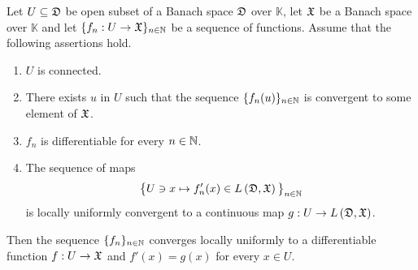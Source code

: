 \begin{theorem}\label{theorem:convergence_of_differentiable_functions}
Let $U\subseteq {\mathfrak D}$ be open subset of a Banach space ${\mathfrak D}$ over $\mathbb{K}$, let ${\mathfrak X}$ be a Banach space over $\mathbb{K}$  and let $\{f_n:U\rightarrow {\mathfrak X}\}_{n\in {\mathbb N}}$ be a sequence of functions. Assume that the following assertions hold.
\begin{enumerate}[label=\emph{\textbf{(\arabic*)}}, leftmargin=*]
\item $U$ is connected.
\item There exists $u$ in $U$ such that the sequence $\{f_n(u)\}_{n\in {\mathbb N}}$ is convergent to some element of ${\mathfrak X}$.
\item $f_n$ is differentiable for every $n\in {\mathbb N}$.
\item The sequence of maps
$$\big\{U\ni x \mapsto f_n'(x) \in L\left({\mathfrak D},{\mathfrak X}\right)\big\}_{n\in {\mathbb N}}$$
is locally uniformly convergent to a continuous map $g:U\rightarrow L\left({\mathfrak D},{\mathfrak X}\right)$.
\end{enumerate}
Then the sequence $\{f_n\}_{n\in {\mathbb N}}$ converges locally uniformly to a differentiable function $f:U\rightarrow {\mathfrak X}$ and $f'(x) = g(x)$ for every $x\in U$.
\end{theorem}
